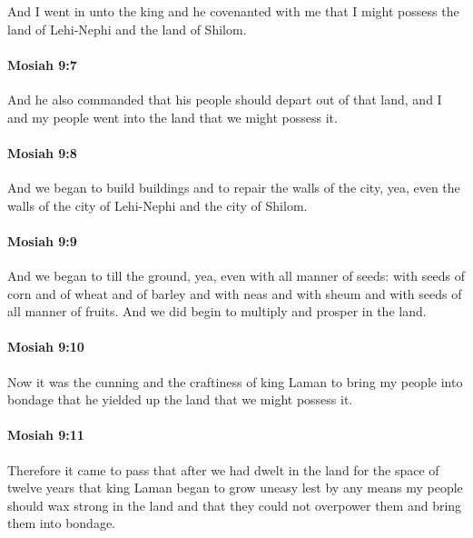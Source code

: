 			And I went in unto the king and he covenanted with me
			that I might possess the land of Lehi-Nephi and the land of Shilom.

		\paragraph{Mosiah 9:7} %
			\label{MOSIAH-9-7}

			And he also commanded that his people should depart out of that land,
			and I and my people went into the land that we might possess it.

		\paragraph{Mosiah 9:8} %
			\label{MOSIAH-9-8}

			And we began to build buildings and to repair the walls of the city,
			yea, even the walls of the city of Lehi-Nephi and the city of Shilom.

		\paragraph{Mosiah 9:9} %
			\label{MOSIAH-9-9}

			And we began to till the ground,
			yea, even with all manner of seeds:
			with seeds of corn and of wheat and of barley
			and with neas and with sheum
			and with seeds of all manner of fruits.
			And we did begin to multiply and prosper in the land.

		\paragraph{Mosiah 9:10} %
			\label{MOSIAH-9-10}

			Now it was the cunning and the craftiness of king Laman
			to bring my people into bondage
			that he yielded up the land that we might possess it.

		\paragraph{Mosiah 9:11} %
			\label{MOSIAH-9-11}

			Therefore it came to pass that
			after we had dwelt in the land for the space of twelve years
			that king Laman began to grow uneasy
			lest by any means my people should wax strong in the land
			and that they could not overpower them and bring them into bondage.

